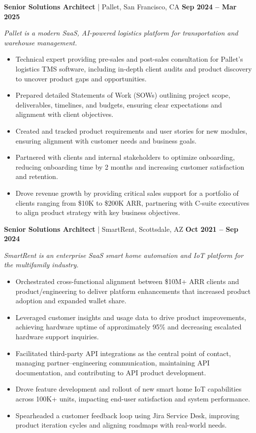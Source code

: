 \documentclass[10pt,letterpaper]{article}
\newcommand{\role}[4]{%
  \vspace{4pt}%
  {\textbf{#2} \textcolor{rulegray}{|} #1 \hfill \textbf{#3}}\par
  {\small\itshape #4\par}}
\newenvironment{roleblock}{\par\begin{minipage}{\textwidth}}{\end{minipage}\par\vspace{7pt}}
\begin{document}
\begin{roleblock}
\role{Pallet, San Francisco, CA}{Senior Solutions Architect}{Sep 2024 -- Mar 2025}
{Pallet is a modern SaaS, AI-powered logistics platform for transportation and warehouse management.}
\begin{itemize}
  \item Technical expert providing pre-sales and post-sales consultation for Pallet's logistics TMS software, including in-depth client audits and product discovery to uncover product gaps and opportunities.
  \item Prepared detailed Statements of Work (SOWs) outlining project scope, deliverables, timelines, and budgets, ensuring clear expectations and alignment with client objectives.
  \item Created and tracked product requirements and user stories for new modules, ensuring alignment with customer needs and business goals.
  \item Partnered with clients and internal stakeholders to optimize onboarding, reducing onboarding time by 2 months and increasing customer satisfaction and retention.
  \item Drove revenue growth by providing critical sales support for a portfolio of clients ranging from \$10K to \$200K ARR, partnering with C-suite executives to align product strategy with key business objectives.
\end{itemize}
\end{roleblock}

\begin{roleblock}
\role{SmartRent, Scottsdale, AZ}{Senior Solutions Architect}{Oct 2021 -- Sep 2024}
{SmartRent is an enterprise SaaS smart home automation and IoT platform for the multifamily industry.}
\begin{itemize}
  \item Orchestrated cross-functional alignment between \$10M+ ARR clients and product/engineering to deliver platform enhancements that increased product adoption and expanded wallet share.
  \item Leveraged customer insights and usage data to drive product improvements, achieving hardware uptime of approximately 95\% and decreasing escalated hardware support inquiries.
  \item Facilitated third-party API integrations as the central point of contact, managing partner--engineering communication, maintaining API documentation, and contributing to API product development.
  \item Drove feature development and rollout of new smart home IoT capabilities across 100K+ units, impacting end-user satisfaction and system performance.
  \item Spearheaded a customer feedback loop using Jira Service Desk, improving product iteration cycles and aligning roadmaps with real-world needs.
\end{itemize}
\end{roleblock}
\end{document}
